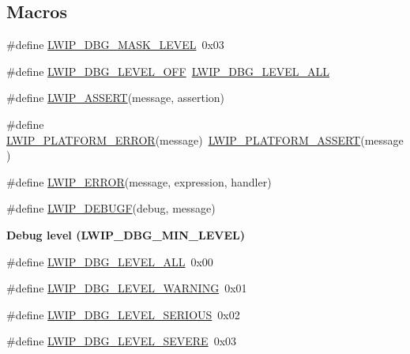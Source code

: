 \subsection*{Macros}
\begin{DoxyCompactItemize}
\item 
\#define \hyperlink{group__debugging__levels_gad64836d29d071e1db104f49a01c951f1}{L\+W\+I\+P\+\_\+\+D\+B\+G\+\_\+\+M\+A\+S\+K\+\_\+\+L\+E\+V\+EL}~0x03
\item 
\#define \hyperlink{group__debugging__levels_gac2faac6759cbe02e4f1f9f27edbed78e}{L\+W\+I\+P\+\_\+\+D\+B\+G\+\_\+\+L\+E\+V\+E\+L\+\_\+\+O\+FF}~\hyperlink{group__debugging__levels_ga8ebaeb006b43f55897f3196b3617dc87}{L\+W\+I\+P\+\_\+\+D\+B\+G\+\_\+\+L\+E\+V\+E\+L\+\_\+\+A\+LL}
\item 
\#define \hyperlink{openmote-cc2538_2lwip_2src_2include_2lwip_2debug_8h_a94ad086267808462beae2b38f91996ed}{L\+W\+I\+P\+\_\+\+A\+S\+S\+E\+RT}(message,  assertion)
\item 
\#define \hyperlink{openmote-cc2538_2lwip_2src_2include_2lwip_2debug_8h_a451cdce6343503ea686ff5e4eff37d3c}{L\+W\+I\+P\+\_\+\+P\+L\+A\+T\+F\+O\+R\+M\+\_\+\+E\+R\+R\+OR}(message)~\hyperlink{group__compiler__abstraction_ga7e8bcd0282525704d6dd596bdd1b47d0}{L\+W\+I\+P\+\_\+\+P\+L\+A\+T\+F\+O\+R\+M\+\_\+\+A\+S\+S\+E\+RT}(message)
\item 
\#define \hyperlink{openmote-cc2538_2lwip_2src_2include_2lwip_2debug_8h_a827bc03cd7889e7c007df39d33b33d18}{L\+W\+I\+P\+\_\+\+E\+R\+R\+OR}(message,  expression,  handler)
\item 
\#define \hyperlink{openmote-cc2538_2lwip_2src_2include_2lwip_2debug_8h_a63a04edf7ff63c951bd8706711956cdb}{L\+W\+I\+P\+\_\+\+D\+E\+B\+U\+GF}(debug,  message)
\end{DoxyCompactItemize}
\begin{Indent}\textbf{ Debug level (L\+W\+I\+P\+\_\+\+D\+B\+G\+\_\+\+M\+I\+N\+\_\+\+L\+E\+V\+EL)}\par
\begin{DoxyCompactItemize}
\item 
\#define \hyperlink{group__debugging__levels_ga8ebaeb006b43f55897f3196b3617dc87}{L\+W\+I\+P\+\_\+\+D\+B\+G\+\_\+\+L\+E\+V\+E\+L\+\_\+\+A\+LL}~0x00
\item 
\#define \hyperlink{group__debugging__levels_ga77c491e468bf7d9a1bc48430c1866a96}{L\+W\+I\+P\+\_\+\+D\+B\+G\+\_\+\+L\+E\+V\+E\+L\+\_\+\+W\+A\+R\+N\+I\+NG}~0x01
\item 
\#define \hyperlink{group__debugging__levels_ga0269bdc51f1e8a5ecf9af72c6e1c996c}{L\+W\+I\+P\+\_\+\+D\+B\+G\+\_\+\+L\+E\+V\+E\+L\+\_\+\+S\+E\+R\+I\+O\+US}~0x02
\item 
\#define \hyperlink{group__debugging__levels_gaab41143277cd38047b6660d90e9cec3b}{L\+W\+I\+P\+\_\+\+D\+B\+G\+\_\+\+L\+E\+V\+E\+L\+\_\+\+S\+E\+V\+E\+RE}~0x03
\end{DoxyCompactItemize}
\end{Indent}
